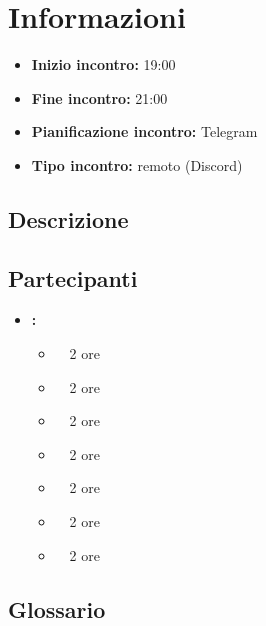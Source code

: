 \section{Informazioni}
\begin{itemize}
	\item \textbf{Inizio incontro:} 19:00
	\item \textbf{Fine incontro:} 21:00
	\item \textbf{Pianificazione incontro:} Telegram
	\item \textbf{Tipo incontro:} remoto (Discord)
\end{itemize}

\subsection{Descrizione}
\DocDescription

\subsection{Partecipanti}

\begin{itemize}
	\item \textbf{\GroupName:}
	\begin{itemize}
		\item \tommaso \ \rightarrow\ 2 ore
		\item \marco \ \rightarrow\ 2 ore
		\item \riccardo \ \rightarrow\ 2 ore
		\item \raul \ \rightarrow\ 2 ore
		\item \martina \ \rightarrow\ 2 ore
		\item \sebastiano \ \rightarrow\ 2 ore
		\item \mattia \ \rightarrow\ 2 ore
	\end{itemize}
\end{itemize}

\subsection{Glossario}
\GlossarioIntroduzione

\clearpage